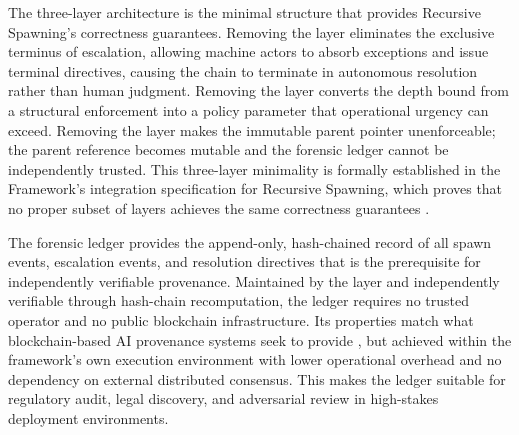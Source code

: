 The three-layer architecture is the minimal structure that provides Recursive Spawning's correctness guarantees.  Removing the \purpose{} layer eliminates the exclusive terminus of escalation, allowing machine actors to absorb exceptions and issue terminal directives, causing the chain to terminate in autonomous resolution rather than human judgment.  Removing the \bounds{} layer converts the depth bound from a structural enforcement into a policy parameter that operational urgency can exceed.  Removing the \fact{} layer makes the immutable parent pointer unenforceable; the parent reference becomes mutable and the forensic ledger cannot be independently trusted.  This three-layer minimality is formally established in the \bxthree{} Framework's integration specification for Recursive Spawning, which proves that no proper subset of layers achieves the same correctness guarantees \cite{bx3framework}.

The \bxthree{} forensic ledger provides the append-only, hash-chained record of all spawn events, escalation events, and resolution directives that is the prerequisite for independently verifiable provenance.  Maintained by the \fact{} layer and independently verifiable through hash-chain recomputation, the ledger requires no trusted operator and no public blockchain infrastructure.  Its properties match what blockchain-based AI provenance systems seek to provide \cite{on_chain_provenance_ai}, but achieved within the framework's own execution environment with lower operational overhead and no dependency on external distributed consensus.  This makes the ledger suitable for regulatory audit, legal discovery, and adversarial review in high-stakes deployment environments.
